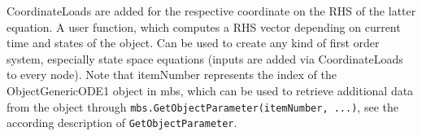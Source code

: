     CoordinateLoads are added for the respective  coordinate on the RHS of the latter equation.
    A user function, which computes a RHS vector depending on current time and states of the object. 
    Can be used to create any kind of first order system, especially state space equations (inputs are added via CoordinateLoads to every node).
    Note that itemNumber represents the index of the ObjectGenericODE1 object in mbs, which can be used to retrieve additional data from the object through
    \texttt{mbs.GetObjectParameter(itemNumber, ...)}, see the according description of \texttt{GetObjectParameter}.
    \finishTable
